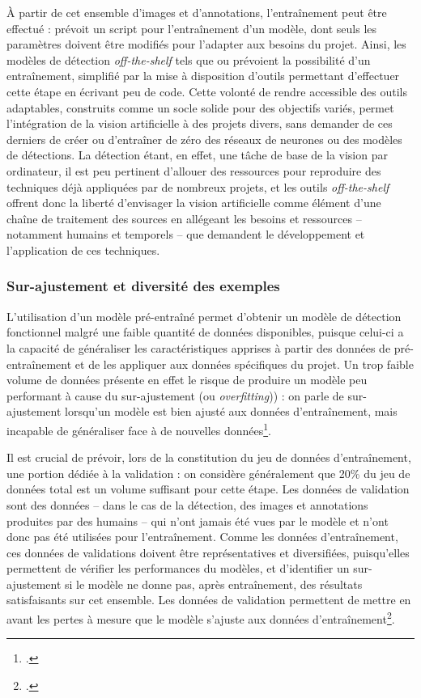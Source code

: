 	À partir de cet ensemble d'images et d'annotations, l'entraînement peut être effectué : \yolov prévoit un script pour l'entraînement d'un modèle, dont seuls les paramètres doivent être modifiés pour l'adapter aux besoins du projet. Ainsi, les modèles de détection \textit{off-the-shelf} tels que \yolo ou \docex prévoient la possibilité d'un entraînement, simplifié par la mise à disposition d'outils permettant d'effectuer cette étape en écrivant peu de code. Cette volonté de rendre accessible des outils adaptables, construits comme un socle solide pour des objectifs variés, permet l'intégration de la vision artificielle à des projets divers, sans demander de ces derniers de créer ou d'entraîner de zéro des réseaux de neurones ou des modèles de détections. La détection étant, en effet, une tâche de base de la vision par ordinateur, il est peu pertinent d'allouer des ressources pour reproduire des techniques déjà appliquées par de nombreux projets, et les outils \textit{off-the-shelf} offrent donc la liberté d'envisager la vision artificielle comme élément d'une chaîne de traitement des sources en allégeant les besoins et ressources -- notamment humains et temporels -- que demandent le développement et l'application de ces techniques. 

    \subsubsection{Sur-ajustement et diversité des exemples}
	
	L'utilisation d'un modèle pré-entraîné permet d'obtenir un modèle de détection fonctionnel malgré une faible quantité de données disponibles, puisque celui-ci a la capacité de généraliser les caractéristiques apprises à partir des données de pré-entraînement et de les appliquer aux données spécifiques du projet. Un trop faible volume de données présente en effet le risque de produire un modèle peu performant à cause du sur-ajustement (ou \textit{overfitting})) : on parle de sur-ajustement lorsqu'un modèle est bien ajusté aux données d'entraînement, mais incapable de généraliser face à de nouvelles données\footcite{cholletApprentissageProfondAvec2020a}. 
	
	Il est crucial de prévoir, lors de la constitution du jeu de données d'entraînement, une portion dédiée à la validation : on considère généralement que 20\% du jeu de données total est un volume suffisant pour cette étape. Les données de validation sont des données -- dans le cas de la détection, des images et annotations produites par des humains -- qui n'ont jamais été vues par le modèle et n'ont donc pas été utilisées pour l'entraînement. Comme les données d'entraînement, ces données de validations doivent être représentatives et diversifiées, puisqu'elles permettent de vérifier les performances du modèles, et d'identifier un sur-ajustement si le modèle ne donne pas, après entraînement, des résultats satisfaisants sur cet ensemble. Les données de validation permettent de mettre en avant les pertes à mesure que le modèle s'ajuste aux données d'entraînement\footcite{carremansHandlingOverfittingDeep2019}.
	
